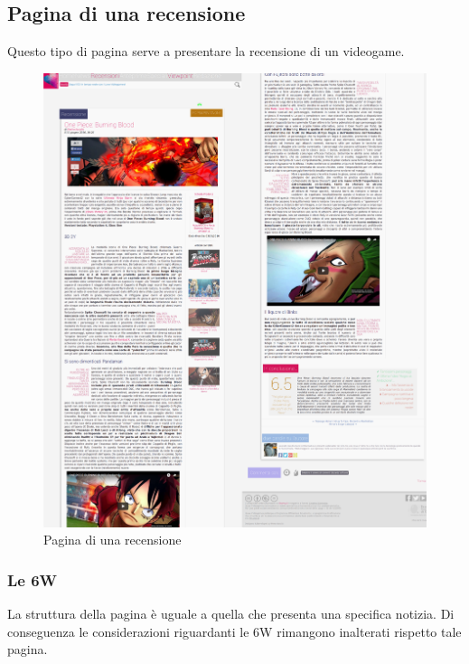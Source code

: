 \documentclass[../ProgettoTecWeb2.tex]{subfiles}
\begin{document}
	\subsection{Pagina di una recensione}
	Questo tipo di pagina serve a presentare la recensione di un videogame.
	\begin{figure} [H]
			\centering
			\includegraphics[scale=0.15]{img/RecensioneSingolaCompleta}
			\caption{Pagina di una recensione}
	\end{figure}
		\subsubsection{Le 6W}
		La struttura della pagina è uguale a quella che presenta una specifica notizia. Di conseguenza le considerazioni riguardanti le 6W rimangono inalterati rispetto tale pagina.
\end{document}
